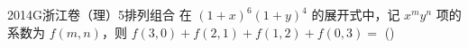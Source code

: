 
\begin{problem}{2014}{G}{浙江卷（理）}{5}{排列组合}
在 $ (1+x)^6(1+y)^4 $ 的展开式中，记 $ x^my^n $ 项的系数为 $ f(m,n) $，则 $ f(3,0)+f(2,1)+f(1,2)+f(0,3)= $ (\hspace{1cm})
\begin{choices}
\end{choices}
\end{problem}

\begin{answer}

\end{answer}

\begin{solutions}

\end{solutions}